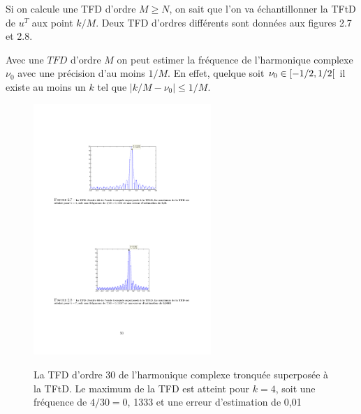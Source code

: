 Si on calcule une TFD d'ordre $M\geq N$, on sait que l'on va \'{e}chantillonner la TFtD de $u^{T}$ aux point $k/M$. Deux TFD d'ordres diff\'{e}rents sont donn\'{e}es aux figures 2.7 et 2.8.


Avec une $TFD$ d'ordre $M$ on peut estimer la fr\'{e}quence de l'harmonique complexe $\nu_{0}$ avec une pr\'{e}cision d'au moins $1/M$.
En effet, quelque soit $\nu_{0} \in \left[-1/2,1/2\right[$ il existe au moins un $k$ tel que  $|k/M - \nu_0| \leq 1/M$.
\begin{figure}
  \centering
  \includegraphics[width=0.6\textwidth]{Figures/Figure2-7}\\
  \caption{La TFD d'ordre 30 de l'harmonique complexe tronqu\'{e}e superpos\'{e}e \`{a} la TFtD. Le maximum de la TFD est atteint pour $k=4$, soit une fr\'{e}quence de $4/30=0$, 1333 et une erreur d'estimation de 0,01}\label{fig:figure2-7}
\end{figure}


